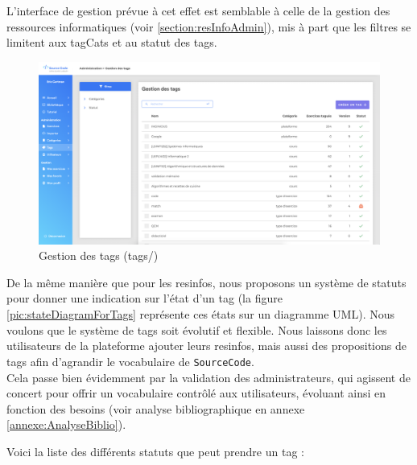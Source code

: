 L'interface de gestion prévue à cet effet est semblable à celle de la gestion des ressources informatiques (voir \ref{section:resInfoAdmin}), mis à part que les filtres se limitent aux \glspl{tagCat} et au statut des \glspl{tag}.

\begin{figure}[H]
    \includegraphics[width=\textwidth,height=\textheight,keepaspectratio]{images/client/tag-admin.png}
    \centering
    \caption[SourceCode : gestion des \glspl{tag}]{Gestion des \glspl{tag} (tags/)}
\end{figure}


De la même manière que pour les \glspl{resinfo}, nous proposons un système de statuts pour donner une indication sur l'état d'un \gls{tag} (la figure \ref{pic:stateDiagramForTags} représente ces états sur un diagramme UML). Nous voulons que le système de \glspl{tag} soit évolutif et flexible. Nous laissons donc les utilisateurs de la plateforme ajouter leurs \glspl{resinfo}, mais aussi des propositions de \glspl{tag} afin d'agrandir le vocabulaire de \texttt{SourceCode}.\\

Cela passe bien évidemment par la validation des administrateurs, qui agissent de concert pour offrir un vocabulaire contrôlé aux utilisateurs, évoluant ainsi en fonction des besoins (voir analyse bibliographique en annexe \ref{annexe:AnalyseBiblio}).

Voici la liste des différents statuts que peut prendre un \gls{tag} :

